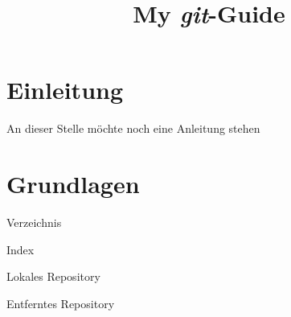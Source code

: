 
\usepackage{enumitem}
\usepackage{wasysym}
\usepackage{blindtext}
\usepackage{framed}
\title{My \emph{git}-Guide}

\maketitle
\tableofcontents
\newpage
\section{Einleitung}
An dieser Stelle möchte noch eine Anleitung stehen \smiley
\newpage

\section{Grundlagen}									%
\begin{minipage}{0.25\textwidth}
	\begin{framed} 		
	\centering 
	\vspace{3cm}
	Verzeichnis 
	\phantom{Repository}
	\vspace{3cm}
	\end{framed} 
\end{minipage}
\begin{minipage}{0.25\textwidth}
	\begin{framed} 		
	\centering 
	\vspace{3cm}
	Index \\
	\phantom{Repository}
	\vspace{3cm}
	\end{framed} 
\end{minipage}
\begin{minipage}{0.25\textwidth}
	\begin{framed} 		
	\centering 
	\vspace{3cm}
	Lokales Repository
	\vspace{3cm} 
	\end{framed} 
\end{minipage}
\begin{minipage}{0.25\textwidth}
	\begin{framed} 		
	\centering 
	\vspace{3cm}
	Entferntes Repository 
	\vspace{3cm}
	\end{framed} 
\end{minipage}
\newpage

